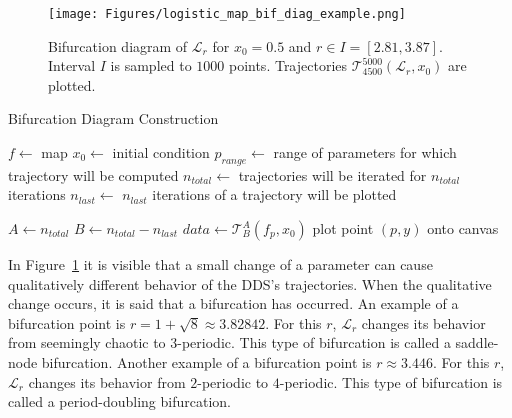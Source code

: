 \begin{figure}[!h]
    \centering
    \texttt{[image: Figures/logistic\_map\_bif\_diag\_example.png]}
    \caption{
        Bifurcation diagram of $\mathcal{L}_{r}$ for $x_0 = 0.5$ and $r \in I = [ 2.81, 3.87 ]$. 
        Interval $I$ is sampled to $1000$ points. 
        Trajectories $\mathcal{T}_{4500}^{5000}(\mathcal{L}_{r}, x_0)$ are plotted.
    }
    \label{fig:bif_diag_example}
\end{figure}

\begin{algorithm}
\caption{Bifurcation Diagram Construction}\label{alg:bif_diag}
\begin{algorithmic}[1]
\Statex $f \gets$ map
\Statex $x_0 \gets$ initial condition
\Statex $p_{range} \gets$ range of parameters for which trajectory will be computed
\Statex $n_{total} \gets$ trajectories will be iterated for $n_{total}$ iterations
\Statex $n_{last} \gets$ $n_{last}$ iterations of a trajectory will be plotted

    \State $A \gets n_{total}$
    \State $B \gets n_{total} - n_{last}$
    \State $data \gets \mathcal{T}_{B}^{A}(f_p, x_0)$
        \State plot point $(p, y)$ onto canvas
    \EndFor
\EndFor

\end{algorithmic}
\end{algorithm}

\begin{remark}
    In Figure~\ref{fig:bif_diag_example} it is visible that a small change of a parameter can cause qualitatively different behavior of the DDS's trajectories.
    When the qualitative change occurs, it is said that a bifurcation has occurred.
    An example of a bifurcation point is $r = 1+\sqrt{8} \approx 3.82842$. For this $r$, $\mathcal{L}_{r}$ changes its behavior from seemingly chaotic to $3$-periodic. 
    This type of bifurcation is called a saddle-node bifurcation.
    Another example of a bifurcation point is $r \approx 3.446$. For this $r$, $\mathcal{L}_{r}$ changes its behavior from $2$-periodic to $4$-periodic.
    This type of bifurcation is called a period-doubling bifurcation.
\end{remark}

\endinput